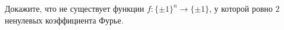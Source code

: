 Докажите, что не существует функции $f\colon \{\pm 1\}^n \to \{\pm 1\}$, у которой ровно $2$ ненулевых
коэффициента Фурье.
